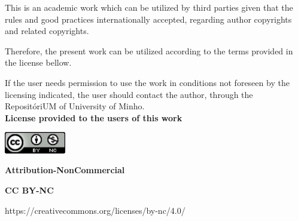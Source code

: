 This is an academic work which can be utilized by third parties given that the rules and good practices internationally accepted, regarding author copyrights and related copyrights.

Therefore, the present work can be utilized according to the terms provided in the license bellow.

If the user needs permission to use the work in conditions not foreseen by the licensing indicated, the user should contact the author, through the RepositóriUM of University of Minho.\\[0.5cm]

\textbf{License provided to the users of this work}

\includegraphics[width=0.2\textwidth]{images/license.png}

\textbf{Attribution-NonCommercial}

\textbf{CC BY-NC}

https://creativecommons.org/licenses/by-nc/4.0/